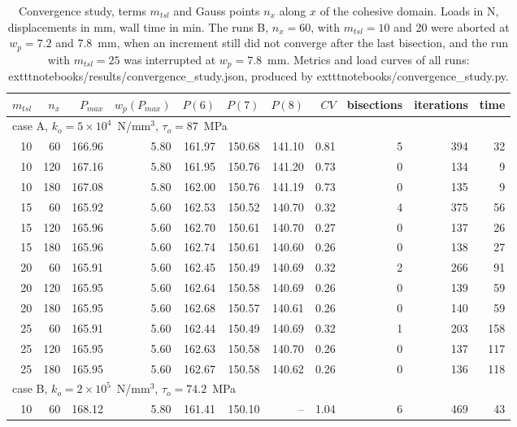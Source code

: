 \begin{table}[htb]
	\centering
	\caption{Convergence study, terms $m_{tsl}$ and Gauss points $n_x$ along $x$ of the cohesive domain. Loads in N, displacements in mm, wall time in min. The runs B, $n_x = 60$, with $m_{tsl} = 10$ and 20 were aborted at $w_p = 7.2$ and 7.8~mm, when an increment still did not converge after the last bisection, and the run with $m_{tsl} = 25$ was interrupted at $w_p = 7.8$~mm. Metrics and load curves of all runs: 	exttt{notebooks/results/convergence\_study.json}, produced by 	exttt{notebooks/convergence\_study.py}.}
	\label{tab:cz-dev-conv-grid}
	\small
	\begin{tabular}{rrrrrrrrrrr}
		\toprule
		$m_{tsl}$ & $n_x$ & $P_{max}$ & $w_p(P_{max})$ & $P(6)$ & $P(7)$ & $P(8)$ & $CV$ & bisections & iterations & time \\
		\midrule
		\multicolumn{11}{l}{case A, $k_o = 5 \times 10^4$~N/mm$^3$, $\tau_o = 87$~MPa} \\
		10 & 60 & 166.96 & 5.80 & 161.97 & 150.68 & 141.10 & 0.81 & 5 & 394 & 32 \\
		10 & 120 & 167.16 & 5.80 & 161.95 & 150.76 & 141.20 & 0.73 & 0 & 134 & 9 \\
		10 & 180 & 167.08 & 5.80 & 162.00 & 150.76 & 141.19 & 0.73 & 0 & 135 & 9 \\
		15 & 60 & 165.92 & 5.60 & 162.53 & 150.52 & 140.70 & 0.32 & 4 & 375 & 56 \\
		15 & 120 & 165.96 & 5.60 & 162.70 & 150.61 & 140.70 & 0.27 & 0 & 137 & 26 \\
		15 & 180 & 165.96 & 5.60 & 162.74 & 150.61 & 140.60 & 0.26 & 0 & 138 & 27 \\
		20 & 60 & 165.91 & 5.60 & 162.45 & 150.49 & 140.69 & 0.32 & 2 & 266 & 91 \\
		20 & 120 & 165.95 & 5.60 & 162.64 & 150.58 & 140.69 & 0.26 & 0 & 139 & 59 \\
		20 & 180 & 165.95 & 5.60 & 162.68 & 150.57 & 140.61 & 0.26 & 0 & 140 & 59 \\
		25 & 60 & 165.91 & 5.60 & 162.44 & 150.49 & 140.69 & 0.32 & 1 & 203 & 158 \\
		25 & 120 & 165.95 & 5.60 & 162.63 & 150.58 & 140.70 & 0.26 & 0 & 137 & 117 \\
		25 & 180 & 165.95 & 5.60 & 162.67 & 150.58 & 140.62 & 0.26 & 0 & 136 & 118 \\
		\midrule
		\multicolumn{11}{l}{case B, $k_o = 2 \times 10^5$~N/mm$^3$, $\tau_o = 74.2$~MPa} \\
		10 & 60 & 168.12 & 5.80 & 161.41 & 150.10 & -- & 1.04 & 6 & 469 & 43 \\

\end{tabular}
\end{table}
